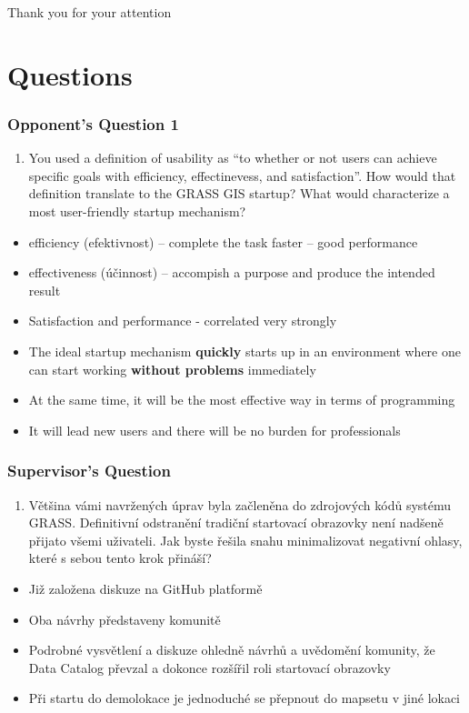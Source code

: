 \documentclass[aspectratio=169]{beamer}
\begin{document}
\begin{frame}
\begin{center}
{\fontsize{20}{40}\selectfont Thank you for your attention}
\end{center}
\end{frame}

\section{Questions}

\begin{frame}
\frametitle{Opponent's Question 1}
\begin{enumerate}
\item{You used a definition of usability as ``to whether or not users can achieve specific goals with efficiency, effectinevess, and satisfaction''. How would that definition translate to the GRASS GIS startup? What would characterize a most user-friendly startup mechanism?}
\end{enumerate}
\begin{itemize}
\vspace{0.3cm}
\item{efficiency (efektivnost) -- complete the task faster -- good performance}
\item{effectiveness (účinnost) -- accompish a purpose and produce the intended result}
\item{Satisfaction and performance - correlated very strongly}
\item{The ideal startup mechanism \textbf{quickly} starts up in an environment where one can start working \textbf{without problems} immediately}
\item{At the same time, it will be the most effective way in terms of programming}
\item{It will lead new users and there will be no burden for professionals} 
\end{itemize}
\end{frame}

\begin{frame}
\frametitle{Supervisor's Question}
\begin{enumerate}
\item{Většina vámi navržených úprav byla začleněna do zdrojových kódů systému GRASS. Definitivní odstranění tradiční startovací obrazovky není nadšeně přijato všemi uživateli. Jak byste řešila snahu minimalizovat negativní ohlasy, které s sebou tento krok přináší?}
\end{enumerate}
\begin{itemize}
\vspace{0.3cm}
\item{Již založena diskuze na GitHub platformě}
\item{Oba návrhy představeny komunitě}
\item{Podrobné vysvětlení a diskuze ohledně návrhů a uvědomění komunity, že Data Catalog převzal a dokonce rozšířil roli startovací obrazovky}
\item{Při startu do demolokace je jednoduché se přepnout do mapsetu v jiné lokaci}
\end{itemize}
\end{frame}
\end{document}
